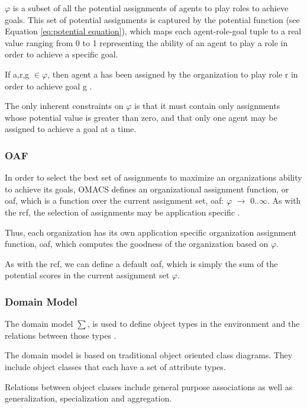 $\varphi$ is a subset of all the potential assignments of agents to play roles to achieve goals. This set of potential assignments is captured by the potential function (see Equation \ref{eq:potential equation}), which maps each agent-role-goal tuple to a real value ranging from 0 to 1 representing the ability of an agent to play a role in order to achieve a specific goal.
	 
If \textlangle a,r,g \textrangle $\in \varphi$, then agent a has been assigned by the organization to play role r in order to achieve goal g \cite{omacs4}.

The only inherent constraints on $\varphi$ is that it must contain only assignments whose potential value is greater than zero, and that only one agent may be assigned to achieve a goal at a time.

 
 		
 

\subsubsection{OAF}
In order to select the best set of assignments to maximize an organizations ability to achieve its goals, OMACS defines an organizational assignment function, or oaf, which is a function over the current assignment set, oaf: $\varphi$ $\rightarrow$ 0..$\infty$. As with the rcf, the selection of assignments may be application specific \cite{omacs4}.
	
Thus, each organization has its own application specific organization assignment function, oaf, which computes the goodness of the organization based on $\varphi$. 
	
As with the rcf, we can define a default oaf, which is simply the sum of the potential scores in the current assignment set $\varphi$.
 
 
\subsubsection{Domain Model} 

The domain model $\sum$, is used to define object types in the environment 
and the relations between those types \cite{omacs2}.

The domain model is based on traditional object oriented class diagrams. They
include object classes that each have a set of attribute types. 

Relations between object classes include general purpose associations
 as well as generalization, specialization and aggregation.
 

